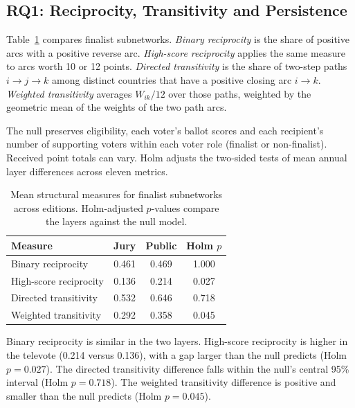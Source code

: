 \documentclass[12pt,a4paper]{article}
\begin{document}



\subsection{RQ1: Reciprocity, Transitivity and Persistence}
\label{sec:rq1}

Table~\ref{tab:rq1_results} compares finalist subnetworks.
\textit{Binary reciprocity} is the share of positive arcs with a positive
reverse arc. \textit{High-score reciprocity} applies the same measure
to arcs worth 10 or 12 points. \textit{Directed transitivity} is the
share of two-step paths $i\to j\to k$ among distinct countries that have
a positive closing arc $i\to k$. \textit{Weighted transitivity} averages
$W_{ik}/12$ over those paths, weighted by the geometric mean of the
weights of the two path arcs.

The null preserves eligibility, each voter's ballot scores and each
recipient's number of supporting voters within each voter role
(finalist or non-finalist). Received point totals can vary.
Holm adjusts the two-sided tests of mean annual layer differences
across eleven metrics.

\begin{table}[htbp]
    \centering
    \caption{Mean structural measures for finalist subnetworks across editions.
    Holm-adjusted $p$-values compare the layers against the null model.}
    \label{tab:rq1_results}
    \small
    \begin{tabular}{lccc}
        \toprule
        \textbf{Measure} &
        \textbf{Jury} &
        \textbf{Public} &
        \textbf{Holm $p$} \\
        \midrule
        Binary reciprocity
            & 0.461 & 0.469 & 1.000 \\
        High-score reciprocity
            & 0.136 & 0.214 & 0.027 \\
        Directed transitivity
            & 0.532 & 0.646 & 0.718 \\
        Weighted transitivity
            & 0.292 & 0.358 & 0.045 \\
        \bottomrule
    \end{tabular}
\end{table}

Binary reciprocity is similar in the two layers. High-score reciprocity
is higher in the televote (0.214 versus 0.136), with a gap larger than
the null predicts (Holm $p=0.027$). The directed transitivity difference
falls within the null's central 95\% interval (Holm $p=0.718$).
The weighted transitivity difference is positive and smaller than
the null predicts (Holm $p=0.045$).
\end{document}
